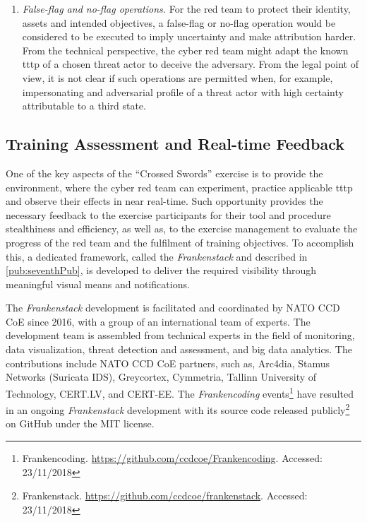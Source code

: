\begin{enumerate}
    \item \textit{False-flag and no-flag operations.} For the red team to protect their identity, assets and intended objectives, a false-flag or no-flag operation would be considered to be executed to imply uncertainty and make attribution harder. From the technical perspective, the cyber red team might adapt the known \gls{tttp} of a chosen threat actor to deceive the adversary. From the legal point of view, it is not clear if such operations are permitted when, for example, impersonating and adversarial profile of a threat actor with high certainty attributable to a third state.
\end{enumerate}


\subsection{Training Assessment and Real-time Feedback}
\label{sec:feedback}
One of the key aspects of the ``Crossed Swords'' exercise is to provide the environment, where the cyber red team can experiment, practice applicable \gls{tttp} and observe their effects in near real-time. Such opportunity provides the necessary feedback to the exercise participants for their tool and procedure stealthiness and efficiency, as well as, to the exercise management to evaluate the progress of the red team and the fulfilment of training objectives.
To accomplish this, a dedicated framework, called the \textit{Frankenstack} and described in \ref{pub:seventhPub}, is developed to deliver the required visibility through meaningful visual means and notifications.

The \textit{Frankenstack} development is facilitated and coordinated by NATO CCD CoE since 2016, with a group of an international team of experts. The development team is assembled from technical experts in the field of monitoring, data visualization, threat detection and assessment, and big data analytics. The contributions include NATO CCD CoE partners, such as, Arc4dia, Stamus Networks (Suricata IDS), Greycortex, Cymmetria, Tallinn University of Technology, CERT.LV, and CERT-EE.
The \textit{Frankencoding} events\footnote{Frankencoding. \url{https://github.com/ccdcoe/Frankencoding}. Accessed: 23/11/2018} have resulted in an ongoing \textit{Frankenstack} development with its source code released publicly\footnote{Frankenstack. \url{https://github.com/ccdcoe/frankenstack}. Accessed: 23/11/2018} on GitHub under the MIT license.


